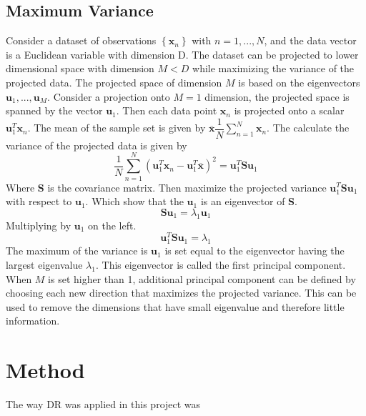 \subsection{Maximum Variance}
Consider a dataset of observations $ \left\lbrace \mathbf{x}_n \right\rbrace $ with $ n = 1,...,N $, and the data vector is a Euclidean variable with dimension D. 
The dataset can be projected to lower dimensional space with dimension $ M<D $ 	while maximizing the variance of the projected data. 
The projected space of dimension $ M $ is based on the eigenvectors $ \mathbf{u}_1, ..., \mathbf{u}_M $.
Consider a projection onto $ M=1 $ dimension, the projected space is spanned by the vector $ \mathbf{u}_1 $. 
Then each data point $ \mathbf{x}_n $ is projected onto a scalar $ \mathbf{u}_1^T \mathbf{x}_n $. The mean of the sample set is given by $ \overline{\mathbf{x}} \dfrac{1}{N}\sum_{n=1}^{N} \mathbf{x}_n $.
The calculate the variance of the projected data is given by
\begin{equation}
\dfrac{1}{N}\sum_{n=1}^{N}\left(\mathbf{u}_1^T \mathbf{x}_n-\mathbf{u}_1^T \overline{\mathbf{x}} \right)^2 = \mathbf{u}_1^T \mathbf{S} \mathbf{u}_1
\end{equation}
Where \textbf{S} is the covariance matrix. 
Then maximize the projected variance $ \mathbf{u}_1^T \mathbf{S} \mathbf{u}_1 $ with respect to $ \mathbf{u}_1 $.
Which show that the $ \mathbf{u}_1 $ is an eigenvector of \textbf{S}.
\begin{equation}
\mathbf{S}\mathbf{u}_1 = \lambda_1 \mathbf{u}_1
\end{equation}
Multiplying by $ \mathbf{u}_1 $ on the left.
\begin{equation}
\mathbf{u}_1^T \mathbf{S}\mathbf{u}_1 = \lambda_1
\end{equation}
The maximum of the variance is $ \mathbf{u}_1 $ is set equal to the eigenvector having the largest eigenvalue $ \lambda_1 $.
This eigenvector is called the first principal component. 
When $ M $ is set higher than 1, additional principal component can be defined by choosing each new direction that maximizes the projected variance.
This can be used to remove the dimensions that have small eigenvalue and therefore little information.         


\section{Method}
The way DR was applied in this project was 


